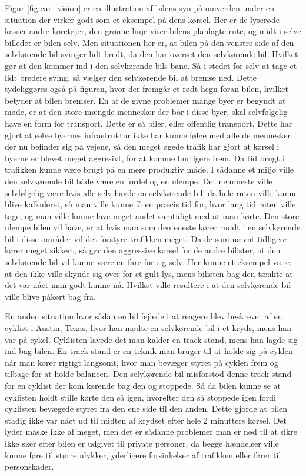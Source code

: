 Figur \ref{fig:car_vision} er en illustration af bilens syn på omverden under en situation der virker godt som et eksempel på dens kørsel. Her er de lyserøde kasser andre køretøjer, den grønne linje viser bilens planlagte rute, og midt i selve billedet er bilen selv. Men situationen her er, at bilen på den venstre side af den selvkørende bil svinger lidt bredt, da den har overset den selvkørende bil. Hvilket gør at den kommer ind i den selvkørende bils bane. Så i stedet for selv at tage et lidt bredere sving, så vælger den selvkørende bil at bremse ned. Dette tydeliggøres også på figuren, hvor der fremgår et rødt hegn foran bilen, hvilket betyder at bilen bremser\cite{Backchannel}. En af de givne problemer mange byer er begyndt at møde, er at den store mængde mennesker der bor i disse byer, skal selvfølgelig have en form for transport. Dette er så biler, eller offentlig transport. Dette har gjort at selve byernes infrastruktur ikke har kunne følge med alle de mennesker der nu befinder sig på vejene, så den meget øgede trafik har gjort at kørsel i byerne er blevet meget aggresivt, for at komme hurtigere frem. Da tid brugt i trafikken kunne være brugt på en mere produktiv måde\cite{Michelin}. I sådanne et miljø ville den selvkørende bil både være en fordel og en ulempe. Det nemmeste ville selvfølgelig være hvis alle selv havde en selvkørende bil, da hele ruten ville kunne blive kalkuleret, så man ville kunne få en præcis tid for, hvor lang tid ruten ville tage, og man ville kunne lave noget andet samtidigt med at man kørte. Den store ulempe bilen vil have, er at hvis man som den eneste kører rundt i en selvkørende bil i disse områder vil det forstyre trafikken meget. Da de som nævnt tidligere kører meget sikkert, så gør den aggressive kørsel for de andre bilister, at den selvkørende bil vil kunne være en fare for sig selv. Her kunne et eksempel være, at den ikke ville skynde sig over for et gult lys, mens bilisten bag den tænkte at det var nået man godt kunne nå. Hvilket ville resultere i at den selvkørende bil ville blive påkørt bag fra.

En anden situation hvor sådan en bil fejlede i at reagere blev beskrevet af en cyklist i Austin, Texas, hvor han mødte en selvkørende bil i et kryds, mens han var på cykel. Cyklisten lavede det man kalder en track-stand, mens han lagde sig ind bag bilen. En track-stand er en teknik man bruger til at holde sig på cyklen når man kører rigtigt langsomt, hvor man bevæger styret på cyklen frem og tilbage for at holde balancen. Den selvkørende bil misforstod denne track-stand for en cyklist der kom kørende bag den og stoppede. Så da bilen kunne se at cyklisten holdt stille kørte den så igen, hvorefter den så stoppede igen fordi cyklisten bevægede styret fra den ene side til den anden. Dette gjorde at bilen stadig ikke var nået ud til midten af krydset efter hele 2 minutters kørsel\cite{VOX}. Det lyder måske ikke af meget, men det er sådanne problemer man er nød til at sikre ikke sker efter bilen er udgivet til private personer, da begge hændelser ville kunne føre til større ulykker, yderligere forsinkelser af trafikken eller fører til personskader. 